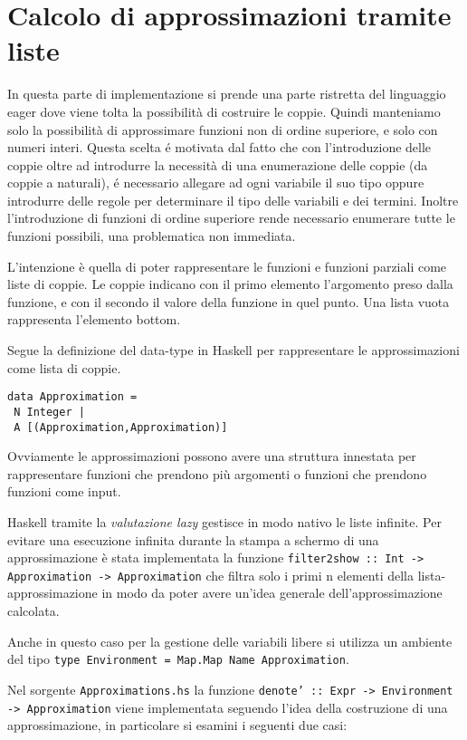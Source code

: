 \documentclass{article}
\begin{document}
\section{Calcolo di approssimazioni tramite liste}
\label{sec:approximations}
In questa parte di implementazione si prende una parte ristretta del linguaggio eager dove viene tolta la possibilità di costruire le coppie.
Quindi manteniamo solo la possibilità di approssimare funzioni non di ordine superiore, e solo con numeri interi. Questa scelta é motivata dal fatto che con l'introduzione delle coppie oltre ad introdurre la necessità di una enumerazione delle coppie (da coppie a naturali), é necessario allegare ad ogni variabile il suo tipo oppure introdurre delle regole per determinare il tipo delle variabili e dei termini. Inoltre l'introduzione di funzioni di ordine superiore rende necessario enumerare tutte le funzioni possibili, una problematica non immediata.

L'intenzione è quella di poter rappresentare le funzioni e funzioni parziali come liste di coppie. Le coppie indicano con il primo elemento l'argomento preso dalla funzione, e con il secondo il valore della funzione in quel punto. Una lista vuota rappresenta l'elemento bottom.

Segue la definizione del data-type in Haskell per rappresentare le approssimazioni come lista di coppie.

\begin{verbatim}
data Approximation = 
 N Integer |
 A [(Approximation,Approximation)]
\end{verbatim}

Ovviamente le approssimazioni possono avere una struttura innestata per rappresentare funzioni che prendono più argomenti o funzioni che prendono funzioni come input.

Haskell tramite la \emph{valutazione lazy} gestisce in modo nativo le liste infinite.
Per evitare una esecuzione infinita durante la stampa a schermo di una approssimazione è stata implementata la funzione \texttt{filter2show :: Int -> Approximation -> Approximation} che filtra solo i primi n elementi della lista-approssimazione in modo da poter avere un'idea generale dell'approssimazione calcolata.

Anche in questo caso per la gestione delle variabili libere si utilizza un ambiente del tipo \texttt{type Environment = Map.Map Name Approximation}.

Nel sorgente \texttt{Approximations.hs} la funzione \texttt{denote' :: Expr -> Environment -> Approximation} viene implementata seguendo l'idea della costruzione di una approssimazione, in particolare si esamini i seguenti due casi:
\end{document}

